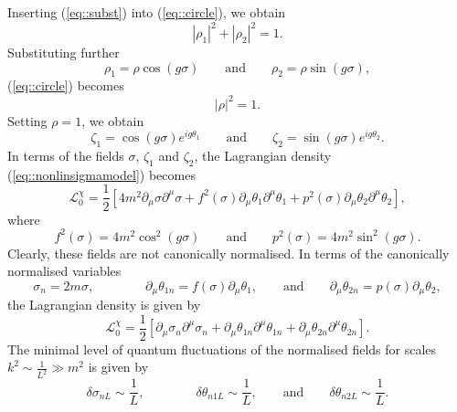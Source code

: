 \documentclass{article}
\begin{document}
Inserting (\ref{eq::subst}) into (\ref{eq::circle}), we obtain 
\begin{equation}
    |\rho_1|^2+|\rho_2|^2=1.
\end{equation}
Substituting further
\begin{equation}
    \rho_1=\rho\cos(g\sigma)\qquad\text{and}\qquad\rho_2=\rho\sin(g\sigma),
\end{equation}
 (\ref{eq::circle}) becomes
\begin{equation}
    |\rho|^2=1.
\end{equation}
Setting $\rho=1$, we obtain
\begin{equation}
    \zeta_1=\cos(g\sigma)e^{ig\theta_1}\qquad\text{and}\qquad \zeta_2=\sin(g\sigma)e^{ig\theta_2}.
\end{equation}
In terms of the fields $\sigma$, $\zeta_1$ and $\zeta_2$, the Lagrangian density (\ref{eq::nonlinsigmamodel}) becomes
\begin{equation}\label{eq::ElLag}
    \mathcal{L}_0^{\chi}=\frac{1}{2}\left[4m^2\partial_{\mu}\sigma\partial^{\mu}\sigma+f^2(\sigma)\partial_{\mu}\theta_1\partial^{\mu}\theta_1+p^2(\sigma)\partial_{\mu}\theta_2\partial^{\mu}\theta_2\right],
\end{equation}
where 
\begin{equation}
    f^2(\sigma)=4m^2\cos^2\left(g\sigma\right)\qquad\text{and}\qquad p^2(\sigma)=4m^2\sin^2\left(g\sigma\right).
\end{equation}
Clearly, these fields are not canonically normalised. In terms of the canonically normalised variables 
\begin{equation}
    \sigma_n=2m\sigma,\qquad\qquad \partial_{\mu}\theta_{1n}=f(\sigma) \partial_{\mu}\theta_{1},\qquad\text{and}\qquad \partial_{\mu}\theta_{2n}=p(\sigma) \partial_{\mu}\theta_{2},
\end{equation}
the Lagrangian density is given by 
\begin{equation}
    \mathcal{L}_0^{\chi}=\frac{1}{2}\left[\partial_{\mu}\sigma_n\partial^{\mu}\sigma_n+\partial_{\mu}\theta_{1n}\partial^{\mu}\theta_{1n}+\partial_{\mu}\theta_{2n}\partial^{\mu}\theta_{2n}\right].
\end{equation}
The minimal level of quantum fluctuations of the normalised fields for scales $k^2\sim\frac{1}{L^2}\gg m^2$ is given by 
\begin{equation}\label{eq::quaFLN}
    \delta\sigma_{nL}\sim\frac{1}{L},\qquad\qquad\delta\theta_{n1L}\sim\frac{1}{L},\qquad\text{and}\qquad \delta\theta_{n2L}\sim\frac{1}{L}.
\end{equation}
\end{document}
